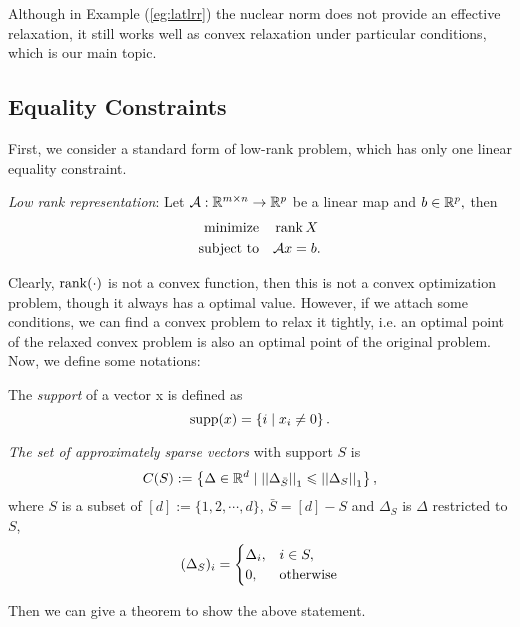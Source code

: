 \documentclass[11pt]{article}
\begin{document}
Although in Example (\ref{eg:latlrr}) the nuclear norm does not provide an effective relaxation, it still works well as convex relaxation under particular conditions, which is our main topic.

\subsection{Equality Constraints}

First, we consider a standard form of low-rank problem, which has only one linear equality constraint.
\begin{definition}
    \emph{Low rank representation}: Let $\mathcal{A}:\mathbb R^{m\times n}\to \mathbb R^p$ be a linear map and $b\in \mathbb R^p,$ then 
    \[\begin{aligned}
        \textnormal{minimize}\quad & \operatorname{rank} X\\
        \textnormal{subject to}\quad & \mathcal Ax=b.
    \end{aligned}\]
\end{definition}

Clearly, $\operatorname{rank}(\cdot)$ is not a convex function, then this is not a convex optimization problem, though it always has a optimal value. However, if we attach some conditions, we can find a convex problem to relax it tightly, i.e. an optimal point of the relaxed convex problem is also an optimal point of the original problem. Now, we define some notations:

\begin{definition}
    The \emph{support} of a vector x is defined as
    \[\operatorname{supp}(x) = \left\{i \mid x_i \neq 0\right\}.\]
\end{definition}

\begin{definition}
    \emph{The set of approximately sparse vectors} with support \(S\) is 
    \[C(S):=\left\{\Delta \in \mathbb R^d \mid \left|\left|\Delta_{\bar{S}}\right|\right|_1\leqslant \left|\left|\Delta_S\right|\right|_1\right\},\]
    where \(S\) is a subset of \([d]:=\{1,2,\cdots,d\}\), $\bar{S}=[d]-S$ and \(\Delta_S\) is \(\Delta\) restricted to \(S\),
    \[(\Delta_S)_i = \begin{cases}
        \Delta_i, & i \in S,\\
        0, & \textnormal{otherwise}
    \end{cases}\]
\end{definition}

Then we can give a theorem to show the above statement.
\end{document}
